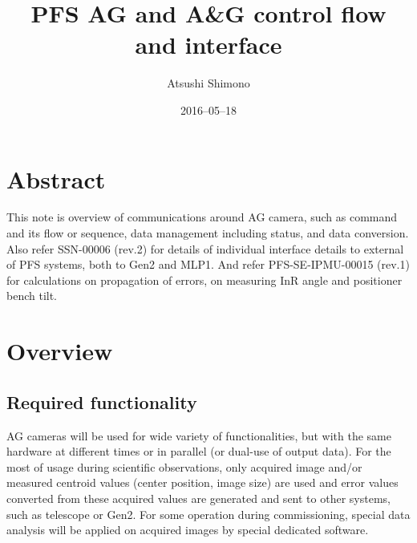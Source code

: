 \documentclass[a4paper,notitlepage]{article}
\title{PFS AG and A\&G control flow and interface}
\author{Atsushi Shimono}
\date{2016--05--18}
\begin{document}
\drafttrue
{}

\ssnhead

\section{Abstract}

This note is overview of communications around AG camera, such as command and 
its flow or sequence, data management including status, and data conversion. 
Also refer SSN-00006 (rev.2) for details of individual interface details to 
external of PFS systems, both to Gen2 and MLP1. And refer PFS-SE-IPMU-00015 
(rev.1) for calculations on propagation of errors, on measuring InR angle and 
positioner bench tilt.

\section{Overview}

\subsection{Required functionality}

AG cameras will be used for wide variety of functionalities, but with the same 
hardware at different times or in parallel (or dual-use of output data). For 
the most of usage during scientific observations, only acquired image and/or 
measured centroid values (center position, image size) are used and error 
values converted from these acquired values are generated and sent to other 
systems, such as telescope or Gen2. For some operation during commissioning, 
special data analysis will be applied on acquired images by special dedicated 
software.
\end{document}
